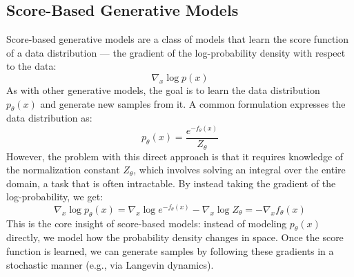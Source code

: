 
\subsection{Score-Based Generative Models}
Score-based generative models \cite{song2021scorebasedgenerativemodelingstochastic} are a class of models that learn
the score function of a data distribution — the gradient of the log-probability density with respect to the data:
$$\nabla_x \log{p(x)}$$
As with other generative models, the goal is to learn the data distribution $p_\theta(x)$ and generate new samples from it.
A common formulation expresses the data distribution as:
$$p_\theta(x) = \frac{e^{-f_\theta(x)}}{Z_\theta}$$
However, the problem with this direct approach is that it requires knowledge of the 
normalization constant $Z_\theta$, which involves solving an integral over the entire 
domain, a task that is often intractable. By instead taking the gradient of the log-probability, we get:
$$\nabla_x \log{p_\theta(x)} = \nabla_x \log{e^{-f_\theta(x)}}-\nabla_x \log{Z_\theta}=- \nabla_x f_\theta(x)$$
This is the core insight of score-based models: instead of modeling $p_\theta(x)$ directly, we model how the probability 
density changes in space. Once the score function is learned, we can generate samples by following these gradients in a 
stochastic manner (e.g., via Langevin dynamics).

